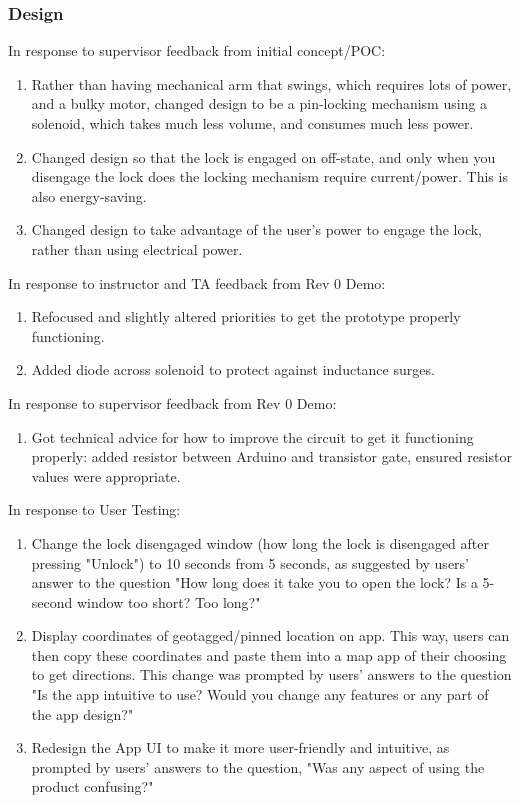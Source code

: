 \documentclass{article}
\begin{document}
\subsubsection{Design}
In response to supervisor feedback from initial concept/POC:
\begin{enumerate}
    \item Rather than having mechanical arm that swings, which requires lots of power, and a bulky motor, changed design to be a pin-locking mechanism using a solenoid, which takes much less volume, and consumes much less power.
    \item Changed design so that the lock is engaged on off-state, and only when you disengage the lock does the locking mechanism require current/power. This is also energy-saving.
    \item Changed design to take advantage of the user's power to engage the lock, rather than using electrical power.
\end{enumerate}

\noindent In response to instructor and TA feedback from Rev 0 Demo:
\begin{enumerate}
    \item Refocused and slightly altered priorities to get the prototype properly functioning.
    \item Added diode across solenoid to protect against inductance surges.
\end{enumerate}

\noindent In response to supervisor feedback from Rev 0 Demo:
\begin{enumerate}
    \item Got technical advice for how to improve the circuit to get it functioning properly: added resistor between Arduino and transistor gate, ensured resistor values were appropriate.
\end{enumerate}

\noindent In response to User Testing:
\begin{enumerate}
    \item Change the lock disengaged window (how long the lock is disengaged after pressing "Unlock") to 10 seconds from 5 seconds, as suggested by users' answer to the question "How long does it take you to open the lock? Is a 5-second window too short? Too long?"
    \item Display coordinates of geotagged/pinned location on app. This way, users can then copy these coordinates and paste them into a map app of their choosing to get directions. This change was prompted by users' answers to the question "Is the app intuitive to use? Would you change any features or any part of the app design?"
    \item Redesign the App UI to make it more user-friendly and intuitive, as prompted by users' answers to the question, "Was any aspect of using the product confusing?"
 
\end{enumerate}
\end{document}
